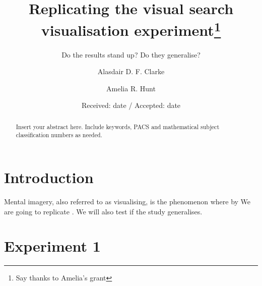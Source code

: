 \documentclass[smallextended]{svjour3}       %
\begin{document}
\title{Replicating the visual search visualisation experiment\thanks{Say thanks to Amelia's grant}}
\subtitle{Do the results stand up? Do they generalise?}


\author{Alasdair D. F. Clarke         \and
        Amelia R. Hunt
}



\date{Received: date / Accepted: date}


\maketitle

\begin{abstract}
Insert your abstract here. Include keywords, PACS and mathematical
subject classification numbers as needed.
\end{abstract}

\section{Introduction}
\label{sec:intro}

Mental imagery, also referred to as visualising, is the phenomenon where by 
We are going to replicate \cite{reinhart2015}. We will also test if the study generalises. 

\section{Experiment 1}
\label{sec:exp1}
\end{document}
